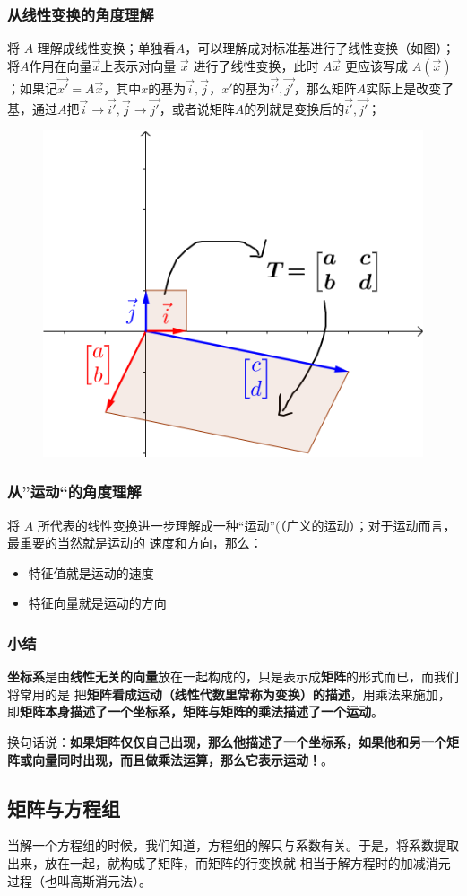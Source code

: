\documentclass[12pt]{article}
\begin{document}
\subsubsection{从线性变换的角度理解}
将 $A$ 理解成线性变换；单独看$A$，可以理解成对标准基进行了线性变换（如图）；将$A$作用在向量$\vec{x}$上表示对向量 $\vec{x}$ 进行了线性变换，此时 $A\vec{x}$ 更应该写成 $A(\vec{x})$；如果记$\vec{x'} = A\vec{x}$，其中$x$的基为$\vec{i}, \vec{j}$，$x'$的基为$\vec{i'}, \vec{j'}$，那么矩阵$A$实际上是改变了基，通过$A$把$\vec{i}\rightarrow\vec{i'},\vec{j}\rightarrow\vec{j'}$，或者说矩阵$A$的列就是变换后的$\vec{i'}, \vec{j'}$；
\begin{figure}[H]
    \centering
    \includegraphics[width=.3\textwidth]{fig/UnderstandDeterminant_4.png}
\end{figure}

\subsubsection{从”运动“的角度理解}
将 $A$ 所代表的线性变换进一步理解成一种“运动”(（广义的运动）；对于运动而言，最重要的当然就是运动的
速度和方向，那么：
\begin{itemize}
\setlength{\itemsep}{0pt}
\setlength{\parsep}{0pt}
\setlength{\parskip}{0pt}
    \item 特征值就是运动的速度
    \item 特征向量就是运动的方向
\end{itemize}

\subsubsection{小结\cite{Fantastic_Matrix_1}}
\textbf{坐标系}是由\textbf{线性无关的向量}放在一起构成的，只是表示成\textbf{矩阵}的形式而已，而我们将常用的是 把\textbf{矩阵看成运动（线性代数里常称为变换）的描述}，用乘法来施加，即\textbf{矩阵本身描述了一个坐标系，矩阵与矩阵的乘法描述了一个运动}。

换句话说：\textbf{如果矩阵仅仅自己出现，那么他描述了一个坐标系，如果他和另一个矩阵或向量同时出现，而且做乘法运算，那么它表示运动！}。

\subsection{矩阵与方程组\cite{Fantastic_Matrix_1}}
当解一个方程组的时候，我们知道，方程组的解只与系数有关。于是，将系数提取出来，放在一起，就构成了矩阵，而矩阵的行变换就 相当于解方程时的加减消元过程（也叫高斯消元法）。
\end{document}
